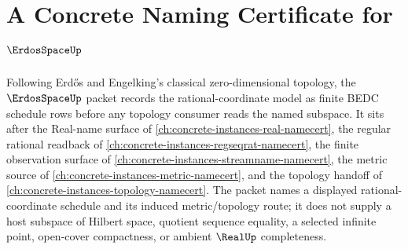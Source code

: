 \chapter{A Concrete Naming Certificate for $\ErdosSpaceUp$}
\label{ch:concrete-instances-erdos-space-namecert}

Following Erdős and Engelking's classical zero-dimensional topology, the $\ErdosSpaceUp$ packet records the rational-coordinate model as finite BEDC schedule rows before any topology consumer reads the named subspace. It sits after the Real-name surface of \autoref{ch:concrete-instances-real-namecert}, the regular rational readback of \autoref{ch:concrete-instances-regseqrat-namecert}, the finite observation surface of \autoref{ch:concrete-instances-streamname-namecert}, the metric source of \autoref{ch:concrete-instances-metric-namecert}, and the topology handoff of \autoref{ch:concrete-instances-topology-namecert}. The packet names a displayed rational-coordinate schedule and its induced metric/topology route; it does not supply a host subspace of Hilbert space, quotient sequence equality, a selected infinite point, open-cover compactness, or ambient $\RealUp$ completeness.


